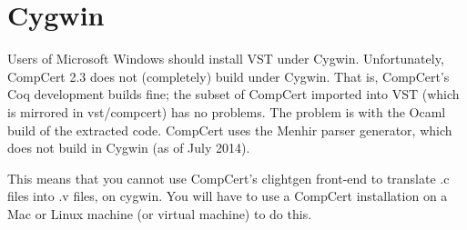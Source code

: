 \documentclass[12pt,fleqn,openany,oneside,showtrims]{memoir}
\newcommand{\ychapter}[2]{\chapter[#1]{#1 \hfill \normalsize #2}}
\begin{document}
\ychapter{Cygwin}{}
\label{refcard:cygwin}
Users of Microsoft Windows should install VST under Cygwin.
Unfortunately, CompCert 2.3 does not (completely) build under Cygwin.
That is, CompCert's Coq development builds fine;
the subset of CompCert imported into VST (which is mirrored
in vst/compcert) has no problems.   The problem is with
the Ocaml build of the extracted code.  CompCert uses
the Menhir parser generator, which does not build in Cygwin
(as of July 2014).

This means that you cannot use CompCert's \textsf{clightgen}
front-end to translate .c files into .v files, on cygwin.
You will have to use a CompCert installation on a Mac or 
Linux machine (or virtual machine) to do this.
\end{document}
